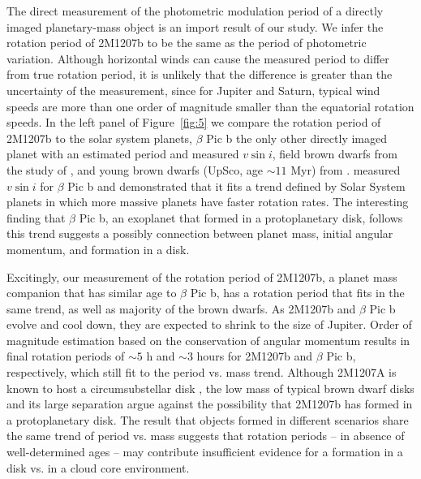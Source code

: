\documentclass[apj]{emulateapj}
\newcommand{\bpic}{$\beta$ Pic}
\newcommand{\vsini}{$v\sin i$}
\newcommand{\revise}[1]{\textbf{{\color{cyan}{#1}}}}
\renewcommand{\revise}{}
\begin{document}
The direct measurement of the
photometric modulation period of a directly imaged planetary-mass
object is an import result of our study.
We infer the rotation period of
2M1207b to be the same as the period of photometric
variation. Although horizontal winds can cause the measured period to
differ from true rotation period, it is unlikely that the difference
is greater than the uncertainty of the measurement, since for Jupiter
and Saturn, typical wind speeds are more than one order of magnitude
smaller than the equatorial rotation speeds.
In the left panel of Figure~\ref{fig:5} we compare the rotation period
of 2M1207b to the solar system planets, \bpic{} b the only other
directly imaged planet with an estimated period and measured \vsini,
field brown dwarfs from the study of \citet[][]{Metchev2015},
\revise{and young brown dwarfs (UpSco, age $\sim 11$ Myr) from
  \citet[][]{Scholz2015}}. \citet[][]{Snellen2014} measured \vsini{}
for \bpic{} b and demonstrated that it fits a trend defined by Solar
System planets in which more massive planets have faster rotation
rates. The interesting finding that \bpic{} b, an exoplanet that
formed in a protoplanetary disk, follows this trend suggests a
possibly connection between planet mass, initial angular momentum, and
formation in a disk.

Excitingly, our measurement of the rotation period of 2M1207b, a
planet mass companion that has similar age to \bpic{} b, has a
rotation period that fits in the same trend, as well as majority of
the brown dwarfs. As 2M1207b and \bpic{} b evolve and cool down, they are
expected to shrink to the size of Jupiter. Order of magnitude
estimation based on the conservation of angular momentum results in
final rotation periods of $\sim 5$ h and $\sim 3$ hours
\citep{Snellen2014} for 2M1207b and \bpic{} b, respectively, which
still fit to the period vs. mass trend. Although 2M1207A is known to
host a circumsubstellar disk \citep{Sterzik2004}, the low mass of
typical brown dwarf disks \citep[e.g.][]{Klein2003, Mohanty2013} and its
large separation argue against the possibility that 2M1207b has formed
in a protoplanetary disk.  The result that objects formed in different
scenarios share the same trend of period vs. mass suggests that
rotation periods -- in absence of well-determined ages -- may
contribute insufficient evidence for a formation in a disk vs. in a
cloud core environment.
\end{document}
